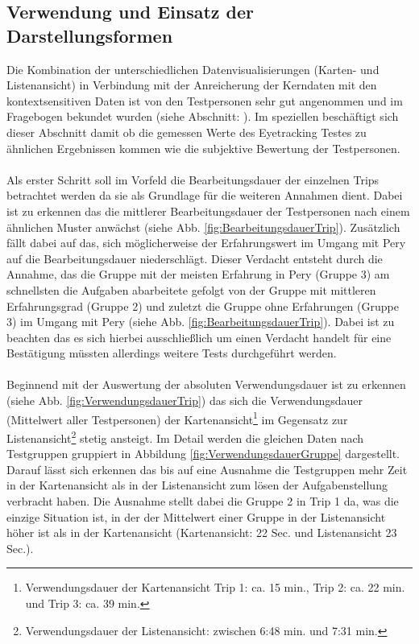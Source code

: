 \documentclass[Bachelorarbeit.tex]{subfiles}
\begin{document}
\subsection{Verwendung und Einsatz der Darstellungsformen}
Die Kombination der unterschiedlichen Datenvisualisierungen (Karten- und Listenansicht) in Verbindung mit der Anreicherung der Kerndaten mit den kontextsensitiven Daten ist von den Testpersonen sehr gut angenommen und im Fragebogen bekundet wurden (siehe Abschnitt: ).
Im speziellen beschäftigt sich dieser Abschnitt damit ob die gemessen Werte des Eyetracking Testes zu ähnlichen Ergebnissen kommen wie die subjektive Bewertung der Testpersonen.\\
\\
Als erster Schritt soll im Vorfeld die Bearbeitungsdauer der einzelnen Trips betrachtet werden da sie als Grundlage für die weiteren Annahmen dient. 
Dabei ist zu erkennen das die mittlerer Bearbeitungsdauer der Testpersonen nach einem ähnlichen Muster anwächst (siehe Abb. \ref{fig:BearbeitungsdauerTrip}).
Zusätzlich fällt dabei auf das, sich möglicherweise der Erfahrungswert im Umgang mit Pery auf die Bearbeitungsdauer niederschlägt.
Dieser Verdacht entsteht durch die Annahme, das die Gruppe mit der meisten Erfahrung in Pery (Gruppe 3) am schnellsten die Aufgaben abarbeitete gefolgt von der Gruppe mit mittleren Erfahrungsgrad (Gruppe 2) und zuletzt die Gruppe ohne Erfahrungen (Gruppe 3) im Umgang mit Pery (siehe Abb. \ref{fig:BearbeitungsdauerTrip}).
Dabei ist zu beachten das es sich hierbei ausschließlich um einen Verdacht handelt für eine Bestätigung müssten allerdings weitere Tests durchgeführt werden.\\
\\
Beginnend mit der Auswertung der absoluten Verwendungsdauer ist zu erkennen (siehe Abb. \ref{fig:VerwendungsdauerTrip}) das sich die Verwendungsdauer (Mittelwert aller Testpersonen) der Kartenansicht\footnote{Verwendungsdauer der Kartenansicht Trip 1: ca. 15 min., Trip 2: ca. 22 min. und Trip 3: ca. 39 min.} im Gegensatz zur Listenansicht\footnote{Verwendungsdauer der Listenansicht: zwischen 6:48 min. und 7:31 min.} stetig ansteigt.  
Im Detail werden die gleichen Daten nach Testgruppen gruppiert in Abbildung \ref{fig:VerwendungsdauerGruppe} dargestellt. 
Darauf lässt sich erkennen das bis auf eine Ausnahme die Testgruppen mehr Zeit in der Kartenansicht als in der Listenansicht zum lösen der Aufgabenstellung verbracht haben. 
Die Ausnahme stellt dabei die Gruppe 2 in Trip 1 da, was die einzige Situation ist, in der der Mittelwert einer Gruppe in der Listenansicht höher ist als in der Kartenansicht (Kartenansicht: 22 Sec. und Listenansicht 23 Sec.).
\end{document}
